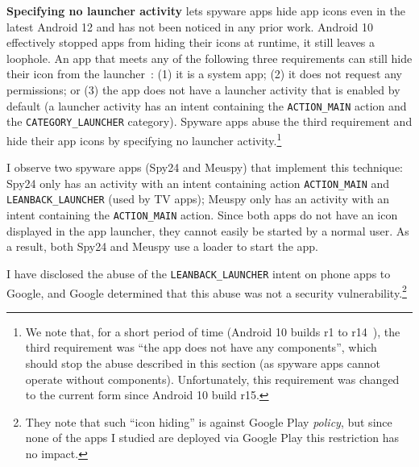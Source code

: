 
\textbf{Specifying no launcher activity} lets spyware apps hide app
icons even in the latest Android 12 and has not been noticed in any prior work.
Android 10 effectively stopped apps from hiding their icons at
runtime, it still leaves a loophole. An app that meets any of the
following three requirements can still hide their icon from the
launcher~\cite{Launcher79:online}: (1) it is a system app; (2) it does
not request any permissions; or (3) the app does not have a launcher
activity that is enabled by default (a launcher activity has an intent
containing the \texttt{ACTION\_MAIN} action and the
\texttt{CATEGORY\_LAUNCHER} category). Spyware apps abuse the third
requirement and hide their app icons by specifying no launcher
activity.\footnote{We note that, for a short period of time (Android 10 builds r1 to r14~\cite{Launcher48:online}), the third requirement was ``the app does not have any components'', which should stop the abuse described in this section (as spyware apps cannot operate without components). Unfortunately, this requirement was changed to the current form since Android 10 build r15.\label{footnote:hide_icon}}

I observe two spyware apps (Spy24 and Meuspy) that implement this
technique: Spy24 only has an activity with an intent containing action
\texttt{ACTION\_MAIN} and \texttt{LEANBACK\_LAUNCHER} (used by TV
apps); Meuspy only has an activity with an intent containing
the \texttt{ACTION\_MAIN} action.
Since both apps do not have an icon displayed in the app launcher,
they cannot easily be started by a normal user.  As a result, both
Spy24 and Meuspy use a loader to start the app.

I have disclosed the abuse of the \texttt{LEANBACK\_LAUNCHER} intent
on phone apps to Google, and Google determined that
this abuse was not a security vulnerability.\footnote{They note that such ``icon hiding'' is against Google Play \emph{policy}, but since none of the apps I studied are deployed via Google Play this restriction has no impact.}

